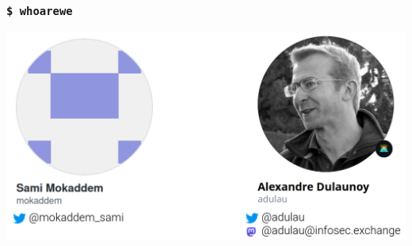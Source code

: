 
\begin{frame}[t,plain]
\titlepage
\end{frame}

\begin{frame}
    \frametitle{\texttt{\$ whoarewe}}
    \begin{center}
        \includegraphics[width=0.8\linewidth]{pictures/whoarewe.png}
    \end{center}
    \vspace*{0.5em}
    \begin{center}
    \end{center}
\end{frame}

